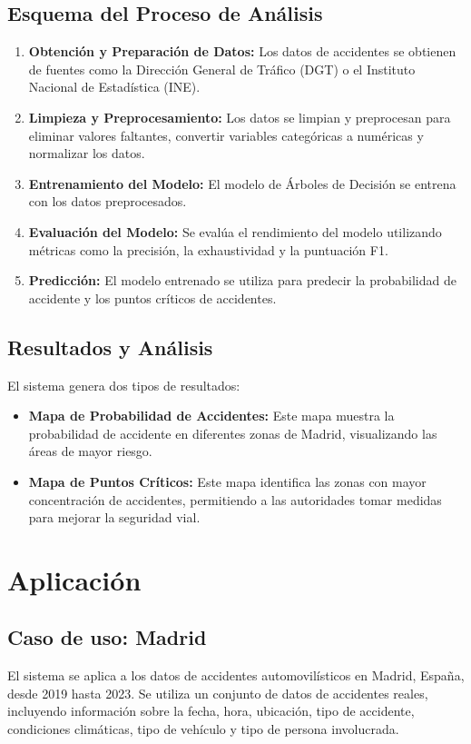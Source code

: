 \subsection{Esquema del Proceso de Análisis}
\begin{enumerate}
\item \textbf{Obtención y Preparación de Datos:} Los datos de accidentes se obtienen de fuentes como la Dirección General de Tráfico (DGT) o el Instituto Nacional de Estadística (INE).

\item \textbf{Limpieza y Preprocesamiento:} Los datos se limpian y preprocesan para eliminar valores faltantes, convertir variables categóricas a numéricas y normalizar los datos.

\item \textbf{Entrenamiento del Modelo:} El modelo de Árboles de Decisión se entrena con los datos preprocesados.

\item \textbf{Evaluación del Modelo:} Se evalúa el rendimiento del modelo utilizando métricas como la precisión, la exhaustividad y la puntuación F1.

\item \textbf{Predicción:} El modelo entrenado se utiliza para predecir la probabilidad de accidente y los puntos críticos de accidentes.
\end{enumerate}

\subsection{Resultados y Análisis}

El sistema genera dos tipos de resultados:
\begin{itemize}
\item \textbf {Mapa de Probabilidad de Accidentes:}  Este mapa muestra la probabilidad de accidente en diferentes zonas de Madrid, visualizando las áreas de mayor riesgo.
\item \textbf {Mapa de Puntos Críticos:}  Este mapa identifica las zonas con mayor concentración de accidentes, permitiendo a las autoridades tomar medidas para mejorar la seguridad vial.
\end{itemize}
\section{Aplicación}
\subsection{Caso de uso: Madrid}
El sistema se aplica a los datos de accidentes automovilísticos en Madrid, España, desde 2019 hasta 2023. Se utiliza un conjunto de datos de accidentes reales, incluyendo información sobre la fecha, hora, ubicación, tipo de accidente, condiciones climáticas, tipo de vehículo y tipo de persona involucrada.
